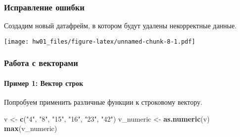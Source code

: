 \documentclass[
]{article}
\newenvironment{Shaded}{\begin{snugshade}}{\end{snugshade}}
\newcommand{\AttributeTok}[1]{\textcolor[rgb]{0.13,0.29,0.53}{#1}}
\newcommand{\DecValTok}[1]{\textcolor[rgb]{0.00,0.00,0.81}{#1}}
\newcommand{\FunctionTok}[1]{\textcolor[rgb]{0.13,0.29,0.53}{\textbf{#1}}}
\newcommand{\NormalTok}[1]{#1}
\newcommand{\OtherTok}[1]{\textcolor[rgb]{0.56,0.35,0.01}{#1}}
\newcommand{\SpecialCharTok}[1]{\textcolor[rgb]{0.81,0.36,0.00}{\textbf{#1}}}
\newcommand{\StringTok}[1]{\textcolor[rgb]{0.31,0.60,0.02}{#1}}
\begin{document}
\subsubsection{Исправление
ошибки}\label{ux438ux441ux43fux440ux430ux432ux43bux435ux43dux438ux435-ux43eux448ux438ux431ux43aux438}

Создадим новый датафрейм, в котором будут удалены некорректные данные.

\begin{Shaded}
\end{Shaded}

\texttt{[image: hw01\_files/figure-latex/unnamed-chunk-8-1.pdf]}

\subsubsection{Работа с
векторами}\label{ux440ux430ux431ux43eux442ux430-ux441-ux432ux435ux43aux442ux43eux440ux430ux43cux438}

\paragraph{Пример 1: Вектор
строк}\label{ux43fux440ux438ux43cux435ux440-1-ux432ux435ux43aux442ux43eux440-ux441ux442ux440ux43eux43a}

Попробуем применить различные функции к строковому вектору.

\begin{Shaded}
\begin{Highlighting}[]
\NormalTok{v }\OtherTok{\textless{}{-}} \FunctionTok{c}\NormalTok{(}\StringTok{"4"}\NormalTok{, }\StringTok{"8"}\NormalTok{, }\StringTok{"15"}\NormalTok{, }\StringTok{"16"}\NormalTok{, }\StringTok{"23"}\NormalTok{, }\StringTok{"42"}\NormalTok{)}
\NormalTok{v\_numeric }\OtherTok{\textless{}{-}} \FunctionTok{as.numeric}\NormalTok{(v)}
\FunctionTok{max}\NormalTok{(v\_numeric)}
\end{Highlighting}
\end{Shaded}
\end{document}
